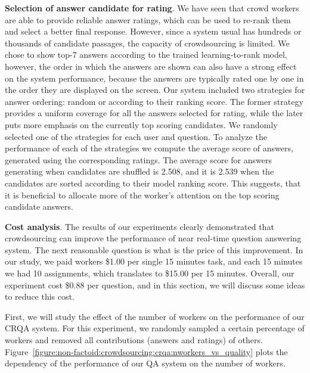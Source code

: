 \textbf{Selection of answer candidate for rating}.
We have seen that crowd workers are able to provide reliable answer ratings, which can be used to re-rank them and select a better final response.
However, since a system usual has hundreds or thousands of candidate passages, the capacity of crowdsourcing is limited.
We chose to show top-7 answers according to the trained learning-to-rank model, however, the order in which the answers are shown can also have a strong effect on the system performance, because the answers are typically rated one by one in the order they are displayed on the screen.
Our system included two strategies for answer ordering: random or according to their ranking score.
The former strategy provides a uniform coverage for all the answers selected for rating, while the later puts more emphasis on the currently top scoring candidates.
We randomly selected one of the strategies for each user and question.
To analyze the performance of each of the strategies we compute the average score of answers, generated using the corresponding ratings.
The average score for answers generating when candidates are shuffled is 2.508, and it is 2.539 when the candidates are sorted according to their model ranking score.
This suggests, that it is beneficial to allocate more of the worker's attention on the top scoring candidate answers.

\textbf{Cost analysis}.
The results of our experiments clearly demonstrated that crowdsourcing can improve the performance of near real-time question answering system.
The next reasonable question is what is the price of this improvement.
In our study, we paid workers \$1.00 per single 15 minutes task, and each 15 minutes we had 10 assignments, which translates to \$15.00 per 15 minutes.
Overall, our experiment cost \$0.88 per question, and in this section, we will discuss some ideas to reduce this cost.

First, we will study the effect of the number of workers on the performance of our CRQA system.
For this experiment, we randomly sampled a certain percentage of workers and removed all contributions (answers and ratings) of others.
Figure~\ref{figure:non-factoid:crowdsourcing:crqa:nworkers_vs_quality} plots the dependency of the performance of our QA system on the number of workers.

